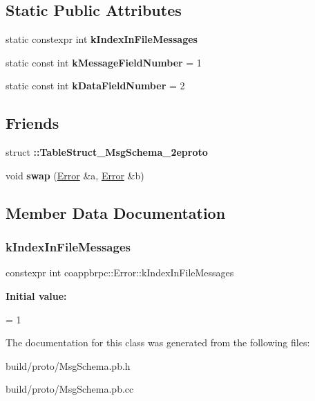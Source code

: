 \subsection*{Static Public Attributes}
\begin{DoxyCompactItemize}
\item 
static constexpr int {\bfseries k\+Index\+In\+File\+Messages}
\item 
\mbox{\label{classcoappbrpc_1_1Error_ac3b04639b8436127975805d710defdaa}} 
static const int {\bfseries k\+Message\+Field\+Number} = 1
\item 
\mbox{\label{classcoappbrpc_1_1Error_afdf01e84439d824f3f8276b0fc18189a}} 
static const int {\bfseries k\+Data\+Field\+Number} = 2
\end{DoxyCompactItemize}
\subsection*{Friends}
\begin{DoxyCompactItemize}
\item 
\mbox{\label{classcoappbrpc_1_1Error_a65c087bf06ded9c9be363691f7b7bafa}} 
struct {\bfseries \+::\+Table\+Struct\+\_\+\+Msg\+Schema\+\_\+2eproto}
\item 
\mbox{\label{classcoappbrpc_1_1Error_a8a56a72c6855aff317cf18b3c5f2fa5d}} 
void {\bfseries swap} (\hyperlink{classcoappbrpc_1_1Error}{Error} \&a, \hyperlink{classcoappbrpc_1_1Error}{Error} \&b)
\end{DoxyCompactItemize}


\subsection{Member Data Documentation}
\mbox{\label{classcoappbrpc_1_1Error_a92d90802862d90205267fb130aa544b9}} 
\subsubsection{\texorpdfstring{k\+Index\+In\+File\+Messages}{kIndexInFileMessages}}
{\footnotesize\ttfamily constexpr int coappbrpc\+::\+Error\+::k\+Index\+In\+File\+Messages\hspace{0.3cm}{\ttfamily [static]}}

{\bfseries Initial value\+:}
\begin{DoxyCode}
=
    1
\end{DoxyCode}


The documentation for this class was generated from the following files\+:\begin{DoxyCompactItemize}
\item 
build/proto/Msg\+Schema.\+pb.\+h\item 
build/proto/Msg\+Schema.\+pb.\+cc\end{DoxyCompactItemize}
